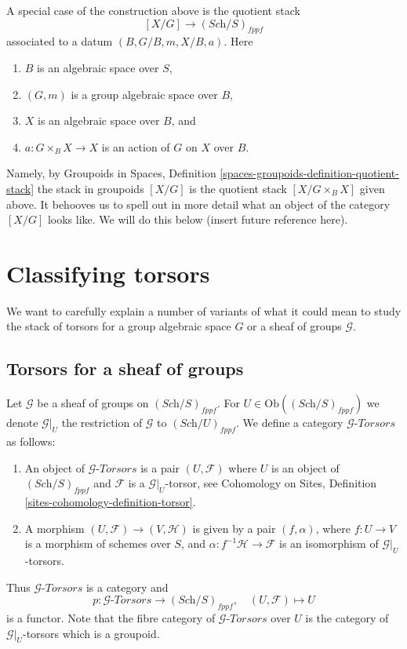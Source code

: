 \medskip\noindent
A special case of the construction above is the quotient stack
$$
[X/G] \longrightarrow (\textit{Sch}/S)_{fppf}
$$
associated to a datum $(B, G/B, m, X/B, a)$. Here
\begin{enumerate}
\item $B$ is an algebraic space over $S$,
\item $(G, m)$ is a group algebraic space over $B$,
\item $X$ is an algebraic space over $B$, and
\item $a : G \times_B X \to X$ is an action of $G$ on $X$ over $B$.
\end{enumerate}
Namely, by
Groupoids in Spaces,
Definition \ref{spaces-groupoids-definition-quotient-stack}
the stack in groupoids $[X/G]$ is the
quotient stack $[X/G \times_B X]$ given above. It behooves us to
spell out in more detail what an object of the category $[X/G]$ looks
like. We will do this below (insert future reference here).



\section{Classifying torsors}
\label{section-torsors}

\noindent
We want to carefully explain a number of variants of what it could
mean to study the stack of torsors for a group algebraic space $G$
or a sheaf of groups $\mathcal{G}$.



\subsection{Torsors for a sheaf of groups}
\label{subsection-torsors-sheaf}

\noindent
Let $\mathcal{G}$ be a sheaf of groups on $(\textit{Sch}/S)_{fppf}$.
For $U \in \text{Ob}((\textit{Sch}/S)_{fppf})$ we denote
$\mathcal{G}|_U$ the restriction of $\mathcal{G}$ to $(\textit{Sch}/U)_{fppf}$.
We define a category $\mathcal{G}\textit{-Torsors}$ as follows:
\begin{enumerate}
\item An object of $\mathcal{G}\textit{-Torsors}$ is a pair
$(U, \mathcal{F})$ where $U$ is an object of $(\textit{Sch}/S)_{fppf}$
and $\mathcal{F}$ is a $\mathcal{G}|_U$-torsor, see
Cohomology on Sites, Definition \ref{sites-cohomology-definition-torsor}.
\item A morphism $(U, \mathcal{F}) \to (V, \mathcal{H})$ is given
by a pair $(f, \alpha)$, where $f : U \to V$ is a morphism of schemes
over $S$, and $\alpha : f^{-1}\mathcal{H} \to \mathcal{F}$ is an
isomorphism of $\mathcal{G}|_U$-torsors.
\end{enumerate}
Thus $\mathcal{G}\textit{-Torsors}$ is a category and
$$
p : \mathcal{G}\textit{-Torsors} \longrightarrow (\textit{Sch}/S)_{fppf},
\quad
(U, \mathcal{F}) \longmapsto U
$$
is a functor. Note that the fibre category of $\mathcal{G}\textit{-Torsors}$
over $U$ is the category of $\mathcal{G}|_U$-torsors which is a groupoid.

